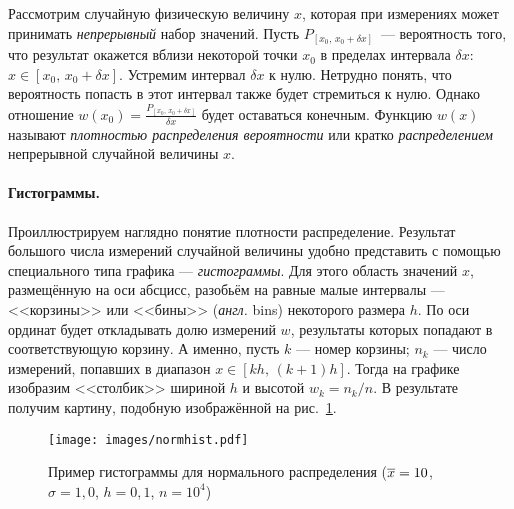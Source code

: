 Рассмотрим случайную физическую величину $x$, которая при измерениях может
принимать \emph{непрерывный} набор значений. Пусть
$P_{[x_0,\,x_0+\delta x]}$~--- вероятность того, что результат окажется вблизи
некоторой точки $x_0$ в пределах интервала $\delta x$: $x\in [x_0,\,x_0+\delta x]$.
Устремим интервал
$\delta x$ к нулю. Нетрудно понять, что вероятность попасть в этот интервал
также будет стремиться к нулю. Однако отношение
$w(x_0) = \frac{P_{[x_0,\,x_0+\delta x]}}{\delta x}$ будет оставаться конечным.
Функцию $w(x)$ называют \emph{плотностью распределения вероятности} или кратко
\emph{распределением} непрерывной случайной величины $x$.



\paragraph{Гистограммы.}
Проиллюстрируем наглядно понятие плотности распределение. Результат
большого числа измерений случайной величины удобно представить с помощью
специального типа графика --- \emph{гистограммы}.
Для этого область значений $x$, размещённую на оси абсцисс, разобьём на
равные малые интервалы --- <<корзины>> или <<бины>> (\emph{англ.} bins)
некоторого размера $h$. По оси ординат будет откладывать долю измерений $w$,
результаты которых попадают в соответствующую корзину. А именно,
пусть $k$ --- номер корзины; $n_k$ --- число измерений, попавших
в диапазон $x\in [kh,\,(k+1)h]$. Тогда  на графике изобразим <<столбик>>
шириной $h$ и высотой $w_{k}=n_{k}/n$.
В результате получим картину, подобную изображённой на рис.~\ref{fig:normhist}.

\begin{figure}[h!]
    \centering
    \texttt{[image: images/normhist.pdf]}
    \caption{Пример гистограммы для нормального распределения ($\overline{x}=10$,
$\sigma=1{,}0$, $h=0{,}1$, $n=10^{4}$)}\label{fig:normhist}
\end{figure}

